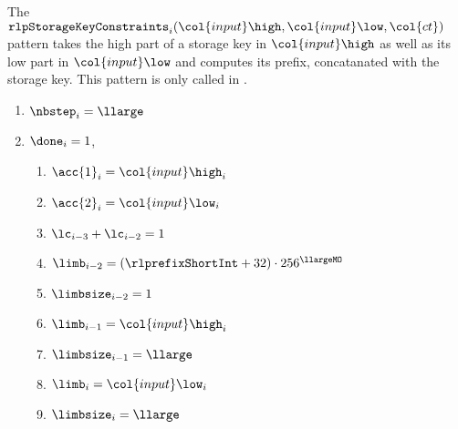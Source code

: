 The $\texttt{rlpStorageKeyConstraints}_{i}(\col{input}\high, \col{input}\low, \col{ct})$ pattern takes
the high part of a storage key in $\col{input}\high$ as well as its low part in $\col{input}\low$
and computes its \rlp{} prefix,
concatanated with the storage key. This pattern is only called in \phaseAccessList{}. 
\begin{enumerate}
    \item $\nbstep_{i}=\llarge$ 
    \item \If $\done_{i}=1$, \Then 
    \begin{enumerate}
        \item $\acc{1}_{i}=\col{input}\high_{i}$
        \item $\acc{2}_{i}=\col{input}\low_{i}$
        \item $\lc_{i-3} + \lc_{i-2}=1$
        \item $\limb_{i-2} = (\rlprefixShortInt+32)\cdot256^{\llargeMO}$
        \item $\limbsize_{i-2}=1$
        \item $\limb_{i-1}=\col{input}\high_{i}$
        \item $\limbsize_{i-1}=\llarge$
        \item $\limb_{i}=\col{input}\low_{i}$
        \item $\limbsize_{i}=\llarge$ 
    \end{enumerate}
\end{enumerate}
